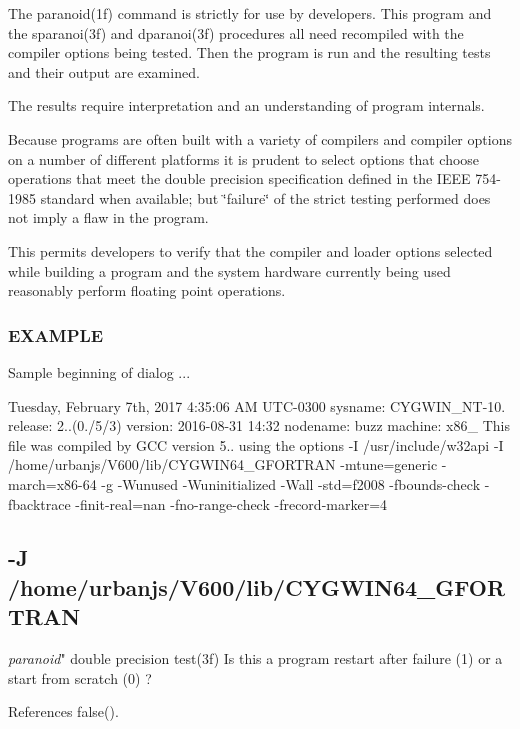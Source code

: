 The paranoid(1f) command is strictly for use by developers. This program and the sparanoi(3f) and dparanoi(3f) procedures all need recompiled with the compiler options being tested. Then the program is run and the resulting tests and their output are examined.

The results require interpretation and an understanding of program internals.

Because programs are often built with a variety of compilers and compiler options on a number of different platforms it is prudent to select options that choose operations that meet the double precision specification defined in the I\+E\+EE 754-\/1985 standard when available; but \char`\"{}failure\char`\"{} of the strict testing performed does not imply a flaw in the program.

This permits developers to verify that the compiler and loader options selected while building a program and the system hardware currently being used reasonably perform floating point operations.

\subsubsection*{E\+X\+A\+M\+P\+LE}

Sample beginning of dialog ... 

 Tuesday, February 7th, 2017 4\+:35\+:06 AM U\+T\+C-\/0300 sysname\+: C\+Y\+G\+W\+I\+N\+\_\+\+N\+T-\/10. release\+: 2..(0./5/3) version\+: 2016-\/08-\/31 14\+:32 nodename\+: buzz machine\+: x86\+\_ This file was compiled by G\+CC version 5.. using the options -\/I /usr/include/w32api -\/I /home/urbanjs/\+V600/lib/\+C\+Y\+G\+W\+I\+N64\+\_\+\+G\+F\+O\+R\+T\+R\+AN -\/mtune=generic -\/march=x86-\/64 -\/g -\/\+Wunused -\/\+Wuninitialized -\/\+Wall -\/std=f2008 -\/fbounds-\/check -\/fbacktrace -\/finit-\/real=nan -\/fno-\/range-\/check -\/frecord-\/marker=4 \subsection*{-\/J /home/urbanjs/\+V600/lib/\+C\+Y\+G\+W\+I\+N64\+\_\+\+G\+F\+O\+R\+T\+R\+AN }

{\itshape paranoid}" double precision test(3f) Is this a program restart after failure (1) or a start from scratch (0) ? 

References false().

\mbox{\label{paranoid_8f90_a5ee1dc76ca482e8a4a44cbd213cce4c1}} 
